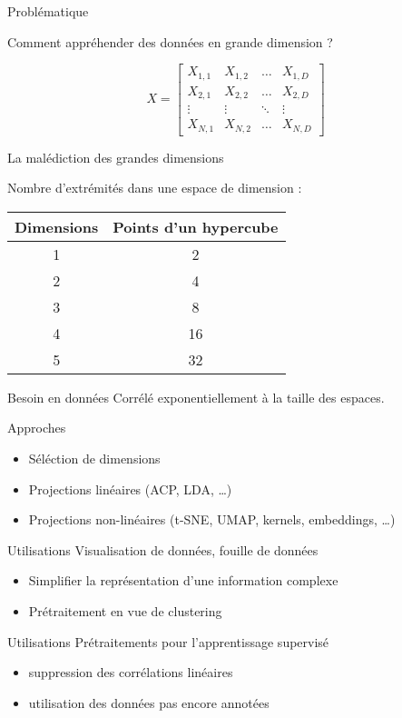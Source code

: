 \begin{frame}{Problématique}
  \begin{center}
    Comment appréhender des données en grande dimension ?
  \end{center}
  \[
  X = \begin{bmatrix}
    X_{1,1} & X_{1,2} & \dots  & X_{1,D} \\
    X_{2,1} & X_{2,2} & \dots  & X_{2,D} \\
    \vdots & \vdots & \ddots & \vdots \\
    X_{N,1} & X_{N,2} & \dots  & X_{N,D}
  \end{bmatrix}
  \]
\end{frame}

\begin{frame}{La malédiction des grandes dimensions}
  \begin{center}
    Nombre d'extrémités dans une espace de dimension : \\
    $\;$ \\
    \begin{tabular}{cc}
      Dimensions & Points d'un hypercube \\
      \midrule
      1 & 2 \\
      2 & 4 \\
        3 & 8 \\
        4 & 16 \\
        5 & 32 \\
      \end{tabular}
    \end{center}
    
    \begin{alertblock}{Besoin en données}
      Corrélé exponentiellement à la taille des espaces.
    \end{alertblock}
\end{frame}

\begin{frame}{Approches}
    \begin{itemize}
    \item Séléction de dimensions
    \item Projections linéaires (ACP, LDA, …)
    \item Projections non-linéaires (t-SNE, UMAP, kernels, embeddings, …)
  \end{itemize}
\end{frame}

\begin{frame}{Utilisations}
  Visualisation de données, fouille de données
  \begin{itemize}
  \item Simplifier la représentation d'une information complexe
  \item Prétraitement en vue de clustering
  \end{itemize}
\end{frame}

\begin{frame}{Utilisations}
  Prétraitements pour l'apprentissage supervisé
  \begin{itemize}
  \item suppression des corrélations linéaires
  \item utilisation des données pas encore annotées
\end{itemize}
\end{frame}
